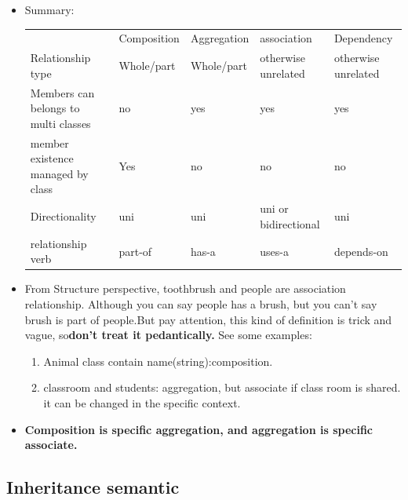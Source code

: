 \documentclass[a4paper,11pt,twoside]{book}
\renewcommand{\hline}{}
\begin{document}
\begin{itemize}
\begin{description}
	\end{description}
	
	\item Summary: \newline
	
	\begin{tabular}{|p{}|p{}|p{}|p{}|p{}|}
		\hline 
		 & Composition  & Aggregation  & association & Dependency \\ 
		\hline 
		Relationship type& Whole/part  & Whole/part  & otherwise unrelated  & otherwise unrelated  \\ 
		\hline 
		Members can belongs to multi classes& no  & yes & yes & yes  \\ 
		\hline 
		member existence managed by class& Yes & no & no   & no \\ 
		\hline 
		Directionality & uni  & uni & uni or bidirectional & uni  \\ 
		\hline 
		relationship verb& part-of & has-a & uses-a & depends-on \\ 
		\hline 
	\end{tabular} 
	
	\item From Structure perspective, toothbrush and people are association relationship. Although you can say people has a brush, but you can't say brush is part of people.But pay attention, this kind of definition is trick and vague, so\textbf{don't treat it pedantically.} See some examples:
	\begin{enumerate}
		\item Animal class contain name(string):composition.
		
		\item classroom and students: aggregation, but associate if class room is shared. it can be changed in the specific context.
	\end{enumerate}

	\item \textbf{Composition is specific aggregation, and aggregation is specific associate.}

\end{itemize}
	

\subsection{Inheritance semantic}
\end{document}

